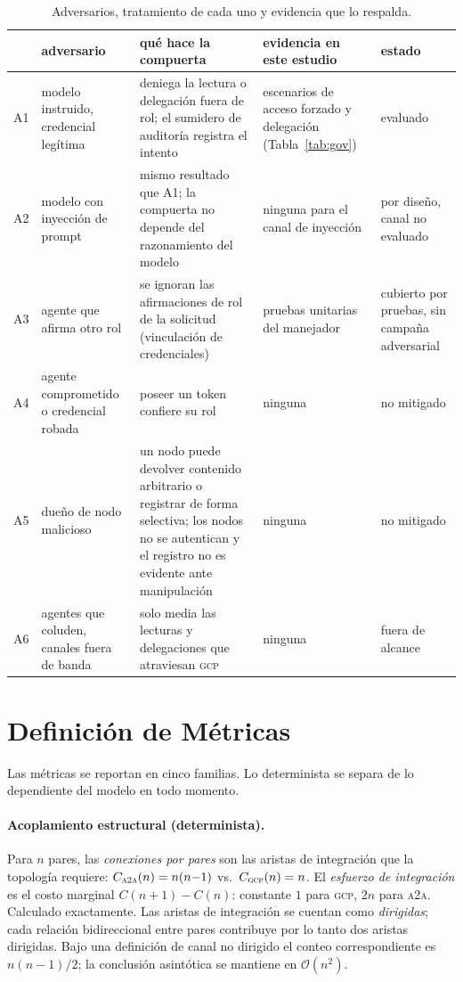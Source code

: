 \documentclass[conference,letterpaper]{IEEEtran}
\newcommand{\gcp}{\textsc{gcp}}
\newcommand{\ata}{\textsc{a2a}}
\newcommand{\bigoh}{\mathcal{O}}
\begin{document}
\begin{table}[t]
\centering
\caption{Adversarios, tratamiento de cada uno y evidencia que lo respalda.}
\label{tab:threat}
\footnotesize
\setlength{\tabcolsep}{4pt}
\begin{tabular}{@{}lp{3.3cm}p{4.6cm}p{4.0cm}p{3.1cm}@{}}
\toprule
 & adversario & qu\'e hace la compuerta & evidencia en este estudio & estado \\
\midrule
A1 & modelo instruido, credencial leg\'itima & deniega la lectura o delegaci\'on fuera de rol; el sumidero de auditor\'ia registra el intento & escenarios de acceso forzado y delegaci\'on (Tabla~\ref{tab:gov}) & evaluado \\
A2 & modelo con inyecci\'on de prompt & mismo resultado que A1; la compuerta no depende del razonamiento del modelo & ninguna para el canal de inyecci\'on & por dise\~no, canal no evaluado \\
A3 & agente que afirma otro rol & se ignoran las afirmaciones de rol de la solicitud (vinculaci\'on de credenciales) & pruebas unitarias del manejador & cubierto por pruebas, sin campa\~na adversarial \\
A4 & agente comprometido o credencial robada & poseer un token confiere su rol & ninguna & no mitigado \\
A5 & due\~no de nodo malicioso & un nodo puede devolver contenido arbitrario o registrar de forma selectiva; los nodos no se autentican y el registro no es evidente ante manipulaci\'on & ninguna & no mitigado \\
A6 & agentes que coluden, canales fuera de banda & solo media las lecturas y delegaciones que atraviesan \gcp{} & ninguna & fuera de alcance \\
\bottomrule
\end{tabular}
\end{table}

\section{Definici\'on de M\'etricas}
\label{sec:metrics}

Las m\'etricas se reportan en cinco familias. Lo determinista se separa de lo dependiente del modelo
en todo momento.

\paragraph{Acoplamiento estructural (determinista).} Para $n$ pares, las \emph{conexiones por pares}
son las aristas de integraci\'on que la topolog\'ia requiere: $C_{\ata{}}(n)=n(n{-}1)$ vs.\
$C_{\gcp{}}(n)=n$. El \emph{esfuerzo de integraci\'on} es el costo marginal $C(n{+}1)-C(n)$: constante
$1$ para \gcp{}, $2n$ para \ata{}. Calculado exactamente. Las aristas de integraci\'on se cuentan como
\emph{dirigidas}; cada relaci\'on bidireccional entre pares contribuye por lo tanto dos aristas
dirigidas. Bajo una definici\'on de canal no dirigido el conteo correspondiente es $n(n{-}1)/2$; la
conclusi\'on asint\'otica se mantiene en $\bigoh(n^2)$.
\end{document}

